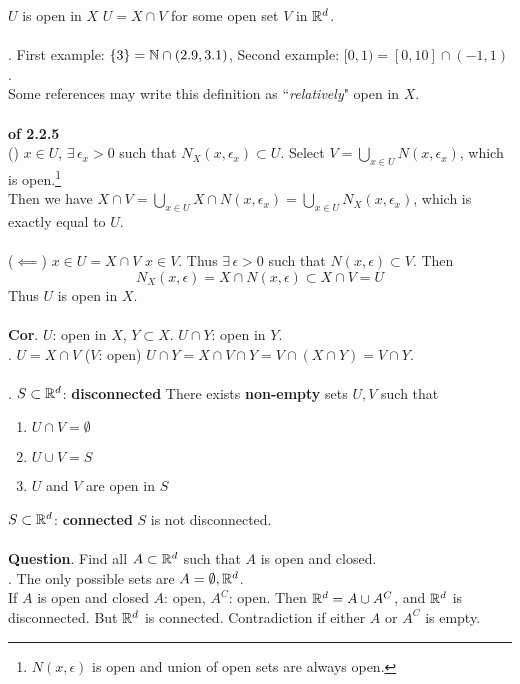  $U$ is open in $X$ \miff $U = X\cap V$ for some open set $V$ in $\mathbb{R}^d$.\\
\\
\rmk. First example: $\{3\} = \mathbb{N} \cap (2.9, 3.1)$, Second example: $[0, 1) = [0, 10] \cap (-1, 1)$.\\
Some references may write this definition as ``\textit{relatively}" open in $X$.\\
\\
\pf\textbf{ of 2.2.5}\\
(\mimp) $x\in U$, $\exists\, \epsilon_x >0$ such that $N_X(x, \epsilon_x) \subset U$. Select $V = \bigcup_{x\in U} N(x, \epsilon_x)$, which is open.\footnote{$N(x, \epsilon)$ is open and union of open sets are always open.}\\
Then we have $X \cap V = \bigcup_{x\in U} X\cap N(x, \epsilon_x) = \bigcup_{x\in U} N_X(x, \epsilon_x)$, which is exactly equal to $U$.\\
\\
($\impliedby$) $x\in U = X\cap V$ \mimp $x\in V$. Thus $\exists\, \epsilon>0$ such that $N(x, \epsilon)\subset V$. Then $$N_X(x, \epsilon) = X\cap N(x, \epsilon) \subset X\cap V = U$$ Thus $U$ is open in $X$.\\
\\
\textbf{Cor}. $U$: open in $X$, $Y\subset X$. \mimp $U\cap Y$: open in $Y$.\\
\pf. $U = X\cap V$ ($V$: open) \mimp $U\cap Y = X\cap V\cap Y = V \cap (X\cap Y) = V\cap Y$.\\
\\
. $S\subset \mathbb{R}^d$: \textbf{disconnected} \miff There exists \textbf{non-empty} sets $U, V$ such that \begin{enumerate}
	\item $U\cap V = \emptyset$
	\item $U\cup V = S$
	\item $U$ and $V$ are open in $S$
\end{enumerate}
$S\subset \mathbb{R}^d$: \textbf{connected} \miff $S$ is not disconnected.\\
\\
\textbf{Question}. Find all $A\subset \mathbb{R}^d$ such that $A$ is open and closed.\\
\pf. The only possible sets are $A = \emptyset, \mathbb{R}^d$.\\
If $A$ is open and closed \mimp $A$: open, $A^C$: open. Then $\mathbb{R}^d = A\cup A^C$, and $\mathbb{R}^d$ is disconnected. But $\mathbb{R}^d$ is connected. Contradiction if either $A$ or $A^C$ is empty.\\
